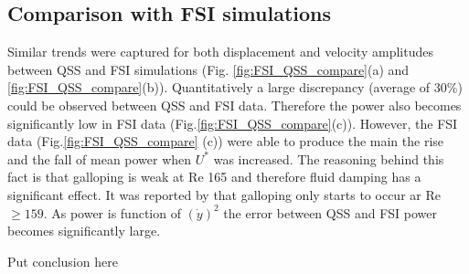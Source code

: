 \subsection{Comparison with FSI simulations}
 Similar trends were captured for both displacement and velocity amplitudes between QSS and FSI simulations (Fig. \ref{fig:FSI_QSS_compare}(a) and \ref{fig:FSI_QSS_compare}(b)). Quantitatively a large discrepancy (average of $30\%$) could be observed between QSS and FSI data. Therefore the power also becomes significantly low in FSI data (Fig.\ref{fig:FSI_QSS_compare}(c)). However, the FSI data (Fig.\ref{fig:FSI_QSS_compare} (c)) were able to produce the main the rise and the fall of mean power when $U^*$ was increased. The reasoning behind this fact is that galloping is weak at Re 165  and therefore fluid damping has a significant effect. It was reported by \cite{Barrero-Gil2009} that galloping only starts to occur ar Re $\geq 159$. As power is function of $(\dot{y})^2$ the error between QSS and FSI power becomes significantly large.  
 
 Put conclusion here 
 
 









 

 
 
 

 
 



 
 
 
 
 
 
 
 
 
 
  
 
 
